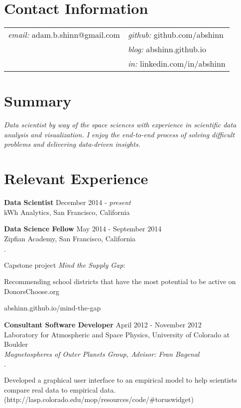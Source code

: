 \documentclass[margin,line]{res}
\newenvironment{list2}{
  \begin{list}{$\cdot$}{%
      \setlength{\itemsep}{0in}
      \setlength{\parsep}{0in} \setlength{\parskip}{0in}
      \setlength{\topsep}{0in} \setlength{\partopsep}{0in} 
      \setlength{\leftmargin}{0.2in}}}{\end{list}}
\begin{document}

\begin{resume}


\section{\sc Contact Information}

\vspace{.1 in}
\begin{tabular}{@{}p{3in}p{4in}}
{\it email:} adam.b.shinn@gmail.com & {\it github:} github.com/abshinn\\
& {\it blog:} abshinn.github.io\\
& {\it in:} linkedin.com/in/abshinn\\
\end{tabular}


\section{\sc Summary}

{\it Data scientist by way of the space sciences with experience in scientific data analysis and visualization. I enjoy the end-to-end process of solving difficult problems and delivering data-driven insights.}


\section{\sc Relevant Experience}

{\bf Data Scientist} \hfill {December 2014 - {\em present}}\\
kWh Analytics, San Francisco, California

{\bf Data Science Fellow} \hfill {May 2014 - September 2014}\\
Zipfian Academy, San Francisco, California
\begin{list2}
\item Capstone project {\em Mind the Supply Gap}:
\item[] Recommending school districts that have the most potential to be active on DonorsChoose.org
\item[] abshinn.github.io/mind-the-gap
\end{list2}

{\bf Consultant Software Developer} \hfill {April 2012 - November 2012}\\
Laboratory for Atmospheric and Space Physics, University of Colorado at Boulder\\
{\em Magnetospheres of Outer Planets Group, Advisor: Fran Bagenal}
\begin{list2}
\item Developed a graphical user interface to an empirical model to help scientists compare real data to empirical data. (http://lasp.colorado.edu/mop/resources/code/\#toruswidget)
\end{list2}


\end{resume}
\end{document}

